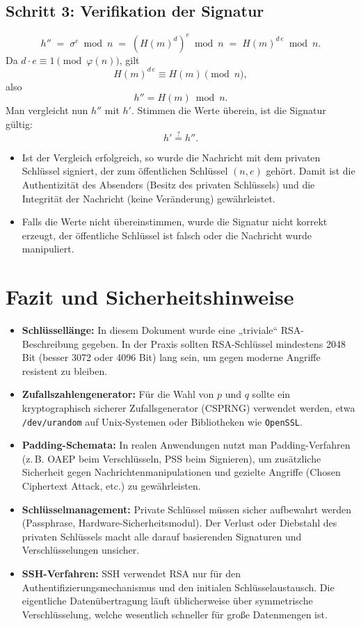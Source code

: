 \documentclass[a4paper,11pt]{article}
\begin{document}
\subsection{Schritt 3: Verifikation der Signatur}
\[
  h'' \;=\; \sigma^e \bmod n \;=\; (H(m)^d)^e \bmod n \;=\; H(m)^{d\,e} \bmod n.
\]
Da \(d \cdot e \equiv 1 \pmod{\varphi(n)}\), gilt
\[
  H(m)^{d\,e} \equiv H(m) \pmod{n},
\]
also
\[
  h'' = H(m) \bmod n.
\]
Man vergleicht nun \(h''\) mit \(h'\). Stimmen die Werte überein, ist die Signatur gültig:
\[
  h' \overset{?}{=} h''.
\]
\begin{itemize}
  \item Ist der Vergleich erfolgreich, so wurde die Nachricht mit dem privaten Schlüssel signiert, der zum öffentlichen Schlüssel \((n,e)\) gehört. Damit ist die Authentizität des Absenders (Besitz des privaten Schlüssels) und die Integrität der Nachricht (keine Veränderung) gewährleistet.
  \item Falls die Werte nicht übereinstimmen, wurde die Signatur nicht korrekt erzeugt, der öffentliche Schlüssel ist falsch oder die Nachricht wurde manipuliert.
\end{itemize}

\section{Fazit und Sicherheitshinweise}
\begin{itemize}
  \item \textbf{Schlüssellänge:} In diesem Dokument wurde eine „triviale“ RSA-Beschreibung gegeben. In der Praxis sollten RSA-Schlüssel mindestens 2048 Bit (besser 3072 oder 4096 Bit) lang sein, um gegen moderne Angriffe resistent zu bleiben.
  \item \textbf{Zufallszahlengenerator:} Für die Wahl von \(p\) und \(q\) sollte ein kryptographisch sicherer Zufallsgenerator (CSPRNG) verwendet werden, etwa \texttt{/dev/urandom} auf Unix-Systemen oder Bibliotheken wie \texttt{OpenSSL}.
  \item \textbf{Padding-Schemata:} In realen Anwendungen nutzt man Padding-Verfahren (z.\,B. OAEP beim Verschlüsseln, PSS beim Signieren), um zusätzliche Sicherheit gegen Nachrichtenmanipulationen und gezielte Angriffe (Chosen Ciphertext Attack, etc.) zu gewährleisten.
  \item \textbf{Schlüsselmanagement:} Private Schlüssel müssen sicher aufbewahrt werden (Passphrase, Hardware-Sicherheitsmodul). Der Verlust oder Diebstahl des privaten Schlüssels macht alle darauf basierenden Signaturen und Verschlüsselungen unsicher.
  \item \textbf{SSH-Verfahren:} SSH verwendet RSA nur für den Authentifizierungsmechanismus und den initialen Schlüsselaustausch. Die eigentliche Datenübertragung läuft üblicherweise über symmetrische Verschlüsselung, welche wesentlich schneller für große Datenmengen ist.
\end{itemize}
\end{document}
